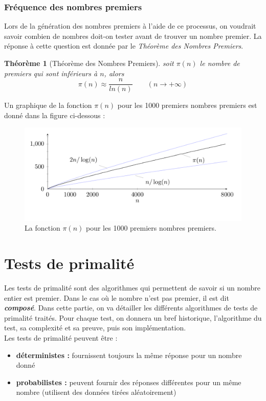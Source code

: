 		\subsubsection*{Fréquence des nombres premiers}
		Lors de la génération des nombres premiers à l'aide de ce processus, on voudrait savoir combien de nombres doit-on tester avant de trouver un nombre premier. La réponse à cette question est donnée par le \textit{Théorème des Nombres Premiers}.
			\newtheorem{Th}{Théorème}
			\vspace{-1.5em}\begin{adjustwidth}{1.5cm}{1.5cm} 
			\begin{Th}[Théorème des Nombres Premiers]
				soit $\pi(n)$ le nombre de premiers qui sont inférieurs à $n$, alors
				\[\pi(n) \approx \frac{n}{ln(n)} \quad \quad (n \to +\infty)\]
			\end{Th}
			\end{adjustwidth}\vspace{0.5em}
		Un graphique de la fonction $\pi(n)$ pour les 1000 premiers nombres premiers est donné dans la figure ci-dessous :
		\begin{figure}[H]
			\begin{center}\includegraphics[scale=0.4]{freqPremiers.png}\end{center}\vspace{-3em}
			\caption{La fonction $\pi(n)$ pour les 1000 premiers nombres premiers.}\label{fig:M3}
		\end{figure}
		
	
	\section{Tests de primalité}
		Les tests de primalité sont des algorithmes qui permettent de savoir si un nombre entier est premier. Dans le cas où le nombre n'est pas premier, il est dit \textbf{\textit{composé}}. Dans cette partie, on va détailler les différents algorithmes de tests de primalité traités. Pour chaque test, on donnera un bref historique, l'algorithme du test, sa complexité et sa preuve, puis son implémentation.\\
		Les tests de primalité peuvent être :
		\begin{itemize}[leftmargin=*]
			\item \textbf{déterministes :} fournissent toujours la même réponse pour un nombre donné
			\item \textbf{probabilistes :} peuvent fournir des réponses différentes pour un même nombre (utilisent des données tirées aléatoirement)
		\end{itemize}
		
